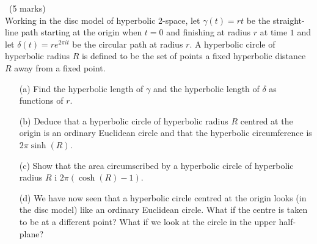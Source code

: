 \documentclass[12pt]{article}
\begin{document}
\begin{question}\ (5 marks)\\
  Working in the disc model of hyperbolic 2-space, let $\gamma(t)=rt$ be the straight-line path starting at the origin when $t=0$ and finishing at radius $r$ at time $1$ and let $\delta(t)=re^{2\pi it}$ be the circular path at radius $r$. A hyperbolic circle of hyperbolic radius $R$ is defined to be the set of points a fixed hyperbolic distance $R$ away from a fixed point.
  \begin{enumerate}
  \item[(a)] Find the hyperbolic length of $\gamma$ and the hyperbolic length of $\delta$ as functions of $r$.
  \item[(b)] Deduce that a hyperbolic circle of hyperbolic radius $R$ centred at the origin is an ordinary Euclidean circle and that the hyperbolic circumference is $2\pi\sinh(R)$.
  \item[(c)] Show that the area circumscribed by a hyperbolic circle of hyperbolic radius $R$ i $2\pi(\cosh(R)-1)$.
  \item[(d)] We have now seen that a hyperbolic circle centred at the origin looks (in the disc model) like an ordinary Euclidean circle. What if the centre is taken to be at a different point? What if we look at the circle in the upper half-plane?
  \end{enumerate}
\end{question}
\iffalse
\begin{answer}
  \begin{enumerate}
  \item[(a)] The length of $\delta$ is given by the integral $\int_0^1\frac{2|\dot{\delta}|}{1+|\delta|^2}dt$ which is $\int_0^1\frac{2r}{1-r^2}dt=\frac{4\pi r}{1-r^2}$. The length of $\gamma$ is $\int_0^1\frac{2dt}{1-t^2}=2\tanh^{-1}(r)$.
  \item[(b)] We see that the points at a distance $R$ from the origin are precisely those which lie on a Euclidean circle of radius $r=\tanh(R/2)$. The hyperbolic circumference of this is just the length of $\delta$ when $r=\tanh(R/2)$, which is
    \[\frac{4\pi\tanh(R/2)}{1-\tanh^2(R/2)}=2\pi(2\sinh(R/2)\cosh(R/2))=2\pi\sinh(R).\]
  \item[(c)] The area is given by integrating the circumference over the radius:
    \[\OP{area}=\int_0^R2\pi\sinh(x)dx=2\pi(\cosh(R)-1).\]
  \item[(d)] If we move a hyperbolic circle centred at $0$ by an isometry $g$ then it maps to a hyperbolic circle centred at $g(0)$. Since the isometries are M\"obius transformations, they take Euclidean circles to Euclidean circles, hence the hyperbolic circles centred at any point look like Euclidean circles. Similarly, since the upper half-plane and the disc are related by a M\"obius transformation, hyperbolic circles in the upper half-plane also look like Euclidean circles.
  \end{enumerate}
\end{answer}
\fi
\end{document}
